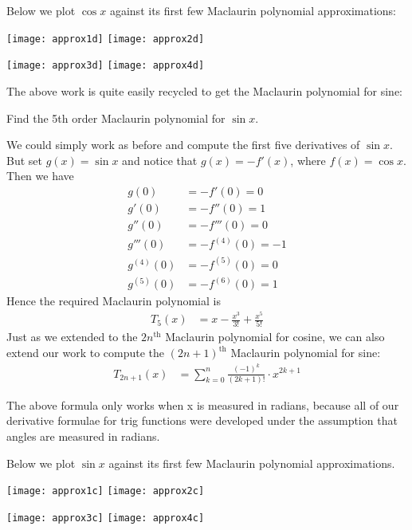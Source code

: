 \begin{eg}
Below we plot $\cos x$ against its first few Maclaurin polynomial
approximations:
\begin{efig}
\begin{center}

  \texttt{[image: approx1d]} \qquad\qquad
  \texttt{[image: approx2d]}
\end{center}
\end{efig}
\begin{efig}
\begin{center}
  \texttt{[image: approx3d]} \qquad\qquad
  \texttt{[image: approx4d]}
\end{center}
\end{efig}

\end{eg}
The above work is quite easily recycled to get the Maclaurin polynomial for sine:
\begin{eg}\label{eg expand sinx}
 Find the 5th order Maclaurin polynomial for $\sin x$.

\soln We could simply work as before and compute the first five derivatives of $\sin x$.
But set $g(x) = \sin x$ and notice that $g(x) = - f'(x)$, where $f(x) =\cos x$. Then we
have
\begin{align*}
  g(0) &= -f'(0) = 0 \\
  g'(0) &= -f''(0) = 1\\
  g''(0) &= -f'''(0) = 0\\
  g'''(0) &= -f^{(4)}(0) = -1\\
  g^{(4)}(0) &= -f^{(5)}(0) = 0\\
  g^{(5)}(0) &= -f^{(6)}(0) = 1
\end{align*}
Hence the required Maclaurin polynomial is
\begin{align*}
  T_5(x) &= x - \frac{x^3}{3!} + \frac{x^5}{5!}
\end{align*}
Just as we extended to the $2n^\mathrm{th}$ Maclaurin polynomial for cosine, we can also
extend our work to compute the $(2n+1)^\mathrm{th}$ Maclaurin polynomial for sine:
\begin{align*}
  T_{2n+1}(x) &= \sum_{k=0}^n \frac{(-1)^k}{(2k+1)!} \cdot x^{2k+1}
\end{align*}
\begin{warning}
The above formula only works when x is measured in radians, because all of our
derivative formulae for trig functions were developed under the assumption that
angles are measured in radians.
\end{warning}


Below we plot $\sin x$ against its first few Maclaurin polynomial approximations.
\begin{efig}
\begin{center}

  \texttt{[image: approx1c]} \qquad\qquad
  \texttt{[image: approx2c]}
\end{center}
\begin{center}
  \texttt{[image: approx3c]} \qquad\qquad
  \texttt{[image: approx4c]}
\end{center}
\end{efig}

\end{eg}

